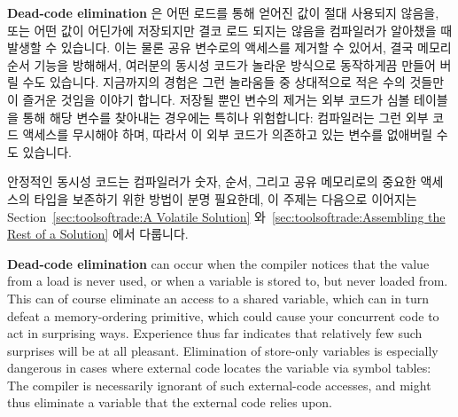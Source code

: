 {\bf Dead-code elimination} 은 어떤 로드를 통해 얻어진 값이 절대 사용되지
않음을, 또는 어떤 값이 어딘가에 저장되지만 결코 로드 되지는 않음을 컴파일러가
알아챘을 때 발생할 수 있습니다.
이는 물론 공유 변수로의 액세스를 제거할 수 있어서, 결국 메모리 순서 기능을
방해해서, 여러분의 동시성 코드가 놀라운 방식으로 동작하게끔 만들어 버릴 수도
있습니다.
지금까지의 경험은 그런 놀라움들 중 상대적으로 적은 수의 것들만이 즐거운 것임을
이야기 합니다.
저장될 뿐인 변수의 제거는 외부 코드가 심볼 테이블을 통해 해당 변수를 찾아내는
경우에는 특히나 위험합니다: 컴파일러는 그런 외부 코드 액세스를 무시해야 하며,
따라서 이 외부 코드가 의존하고 있는 변수를 없애버릴 수도 있습니다.

안정적인 동시성 코드는 컴파일러가 숫자, 순서, 그리고 공유 메모리로의 중요한
액세스의 타입을 보존하기 위한 방법이 분명 필요한데, 이 주제는 다음으로 이어지는
Section~\ref{sec:toolsoftrade:A Volatile Solution}
와~\ref{sec:toolsoftrade:Assembling the Rest of a Solution}
에서 다룹니다.

\iffalse

{\bf Dead-code elimination} can occur when the compiler notices that
the value from a load is never used, or when a variable is stored to,
but never loaded from.
This can of course eliminate an access to a shared variable, which
can in turn defeat a memory-ordering primitive, which could cause your
concurrent code to act in surprising ways.
Experience thus far indicates that relatively few such surprises will
be at all pleasant.
Elimination of store-only variables is especially dangerous in cases
where external code locates the variable via symbol tables: The
compiler is necessarily ignorant of such external-code accesses, and
might thus eliminate a variable that the external code relies upon.


